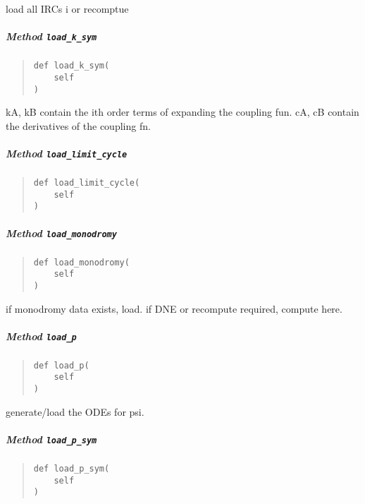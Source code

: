 \documentclass[english,a4paper,oneside]{article}
\let\oldsubparagraph\subparagraph
\renewcommand{\subparagraph}[1]{\oldsubparagraph{#1}\mbox{}}
\begin{document}
load all IRCs i or recomptue

\subparagraph{\texorpdfstring{Method
\texttt{load\_k\_sym}}{Method load\_k\_sym}}\label{StrongCoupling.StrongCoupling.load_k_sym}

\begin{quote}
\begin{verbatim}
def load_k_sym(
    self
)
\end{verbatim}
\end{quote}

kA, kB contain the ith order terms of expanding the coupling fun. cA, cB
contain the derivatives of the coupling fn.

\subparagraph{\texorpdfstring{Method
\texttt{load\_limit\_cycle}}{Method load\_limit\_cycle}}\label{StrongCoupling.StrongCoupling.load_limit_cycle}

\begin{quote}
\begin{verbatim}
def load_limit_cycle(
    self
)
\end{verbatim}
\end{quote}

\subparagraph{\texorpdfstring{Method
\texttt{load\_monodromy}}{Method load\_monodromy}}\label{StrongCoupling.StrongCoupling.load_monodromy}

\begin{quote}
\begin{verbatim}
def load_monodromy(
    self
)
\end{verbatim}
\end{quote}

if monodromy data exists, load. if DNE or recompute required, compute
here.

\subparagraph{\texorpdfstring{Method
\texttt{load\_p}}{Method load\_p}}\label{StrongCoupling.StrongCoupling.load_p}

\begin{quote}
\begin{verbatim}
def load_p(
    self
)
\end{verbatim}
\end{quote}

generate/load the ODEs for psi.

\subparagraph{\texorpdfstring{Method
\texttt{load\_p\_sym}}{Method load\_p\_sym}}\label{StrongCoupling.StrongCoupling.load_p_sym}

\begin{quote}
\begin{verbatim}
def load_p_sym(
    self
)
\end{verbatim}
\end{quote}
\end{document}
